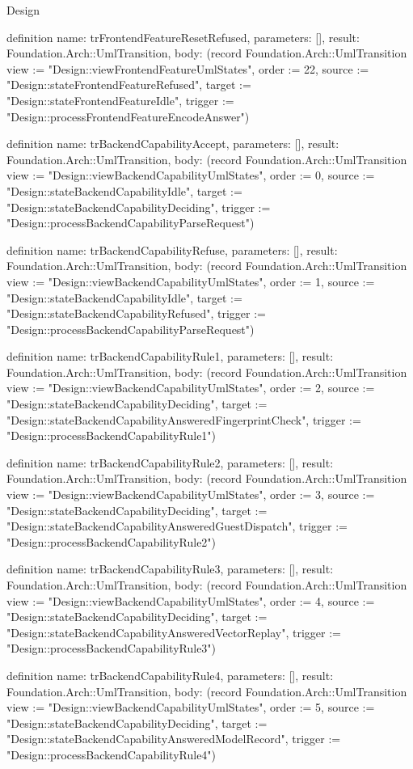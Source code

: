 \begin{lexlean}{Design}
\begin{semanticmodule}
definition{
  name: trFrontendFeatureResetRefused,
  parameters: [],
  result: Foundation.Arch::UmlTransition,
  body: (record Foundation.Arch::UmlTransition {view := "Design::viewFrontendFeatureUmlStates", order := 22, source := "Design::stateFrontendFeatureRefused", target := "Design::stateFrontendFeatureIdle", trigger := "Design::processFrontendFeatureEncodeAnswer"})
}

definition{
  name: trBackendCapabilityAccept,
  parameters: [],
  result: Foundation.Arch::UmlTransition,
  body: (record Foundation.Arch::UmlTransition {view := "Design::viewBackendCapabilityUmlStates", order := 0, source := "Design::stateBackendCapabilityIdle", target := "Design::stateBackendCapabilityDeciding", trigger := "Design::processBackendCapabilityParseRequest"})
}

definition{
  name: trBackendCapabilityRefuse,
  parameters: [],
  result: Foundation.Arch::UmlTransition,
  body: (record Foundation.Arch::UmlTransition {view := "Design::viewBackendCapabilityUmlStates", order := 1, source := "Design::stateBackendCapabilityIdle", target := "Design::stateBackendCapabilityRefused", trigger := "Design::processBackendCapabilityParseRequest"})
}

definition{
  name: trBackendCapabilityRule1,
  parameters: [],
  result: Foundation.Arch::UmlTransition,
  body: (record Foundation.Arch::UmlTransition {view := "Design::viewBackendCapabilityUmlStates", order := 2, source := "Design::stateBackendCapabilityDeciding", target := "Design::stateBackendCapabilityAnsweredFingerprintCheck", trigger := "Design::processBackendCapabilityRule1"})
}

definition{
  name: trBackendCapabilityRule2,
  parameters: [],
  result: Foundation.Arch::UmlTransition,
  body: (record Foundation.Arch::UmlTransition {view := "Design::viewBackendCapabilityUmlStates", order := 3, source := "Design::stateBackendCapabilityDeciding", target := "Design::stateBackendCapabilityAnsweredGuestDispatch", trigger := "Design::processBackendCapabilityRule2"})
}

definition{
  name: trBackendCapabilityRule3,
  parameters: [],
  result: Foundation.Arch::UmlTransition,
  body: (record Foundation.Arch::UmlTransition {view := "Design::viewBackendCapabilityUmlStates", order := 4, source := "Design::stateBackendCapabilityDeciding", target := "Design::stateBackendCapabilityAnsweredVectorReplay", trigger := "Design::processBackendCapabilityRule3"})
}

definition{
  name: trBackendCapabilityRule4,
  parameters: [],
  result: Foundation.Arch::UmlTransition,
  body: (record Foundation.Arch::UmlTransition {view := "Design::viewBackendCapabilityUmlStates", order := 5, source := "Design::stateBackendCapabilityDeciding", target := "Design::stateBackendCapabilityAnsweredModelRecord", trigger := "Design::processBackendCapabilityRule4"})
}


\end{semanticmodule}
\end{lexlean}
